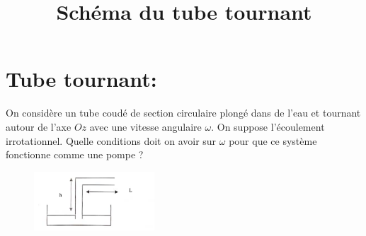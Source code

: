 \documentclass{article}
\begin{document}
    \section{Tube tournant:} 
    On considère un tube coudé de section circulaire plongé dans de l'eau et tournant autour de l'axe $Oz$ avec une vitesse angulaire $\omega$.
    On suppose l'écoulement irrotationnel.
    Quelle conditions doit on avoir sur $\omega$ pour que ce système fonctionne comme une pompe ? 

    \begin{figure}[h]
        \centering
        \includegraphics[width=0.4\textwidth]{tube_tournant.png}
        \label{fig:image1}
        \title{Schéma du tube tournant}

      \end{figure}
        
\end{document}
